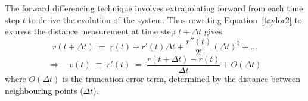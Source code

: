 \documentclass[namedreferences]{SolarPhysics}
\begin{document}
\begin{article}
The forward differencing technique involves extrapolating forward from each time step $t$ to derive the evolution of the system. Thus rewriting Equation~\ref{taylor2} to express the distance measurement at time step $t+\Delta t$ gives:
\begin{equation}
r(t + \Delta t) \; = \; r(t) + r'(t)\Delta t +  \frac{r''(t)}{2!}(\Delta t)^{2} + ...
\end{equation}
\begin{equation}
\Rightarrow \quad v(t) \; \equiv \; r'(t) \; = \; \frac{r(t + \Delta t) - r(t)}{\Delta t} + O(\Delta t)
\end{equation}
where $O(\Delta t)$ is the truncation error term, determined by the distance between neighbouring points ($\Delta t$). %

\end{article}
\end{document}
